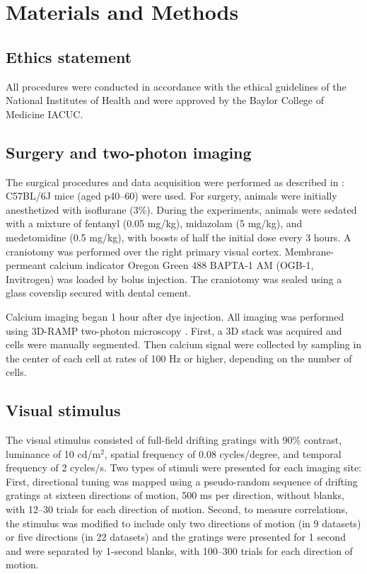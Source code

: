 \section{Materials and Methods}

\subsection*{Ethics statement}
All procedures were conducted in accordance with the ethical guidelines of the National Institutes of Health and were approved by the Baylor College of Medicine IACUC.

\subsection*{Surgery and two-photon imaging}
The surgical procedures and data acquisition were performed as described in \citep{Cotton:2013}: C57BL/6J mice (aged p40--60) were used. For surgery, animals were initially anesthetized with isoflurane (3\%). During the experiments, animals were sedated with a mixture of fentanyl (0.05 mg/kg), midazolam (5 mg/kg), and medetomidine (0.5 mg/kg), with boosts of half the initial dose every 3 hours.  A craniotomy was performed over the right primary visual cortex.  Membrane-permeant calcium indicator Oregon Green 488 BAPTA-1 AM (OGB-1, Invitrogen) was loaded by bolus injection.  The craniotomy was sealed using a glass coverslip secured with dental cement.

Calcium imaging began 1 hour after dye injection.  All imaging was performed using 3D-RAMP two-photon microscopy \citep{Cotton:2013}. First, a 3D stack was acquired and cells were manually segmented. Then calcium signal were collected by sampling in the center of each cell at rates of 100 Hz or higher, depending on the number of cells.

\subsection*{Visual stimulus}
The visual stimulus consisted of full-field drifting gratings with 90\% contrast, luminance of 10 cd/m$^2$, spatial frequency of 0.08 cycles/degree, and temporal frequency of 2 cycles/s. Two types of stimuli were presented for each imaging site: First, directional tuning was mapped using a pseudo-random sequence of drifting gratings at sixteen directions of motion, 500 ms per direction, without blanks, with 12--30 trials for each direction of motion.  Second, to measure correlations, the stimulus was modified to include only two directions of motion (in 9 datasets) or five directions (in 22 datasets) and the gratings were presented for 1 second and were separated by 1-second blanks, with 100--300 trials for each direction of motion.

